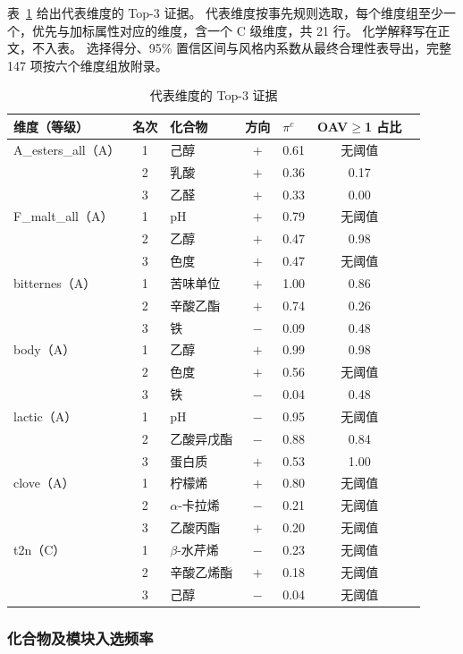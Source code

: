 表~\ref{tab:q2-rep} 给出代表维度的 Top-3 证据。
代表维度按事先规则选取，每个维度组至少一个，优先与加标属性对应的维度，含一个 C 级维度，共 21 行。
化学解释写在正文，不入表。
选择得分、95\% 置信区间与风格内系数从最终合理性表导出，完整 147 项按六个维度组放附录。

\begin{table}[htbp]
\centering\small
\caption{代表维度的 Top-3 证据}
\label{tab:q2-rep}
\begin{tabular}{lclclcl}
\toprule
维度（等级） & 名次 & 化合物 & 方向 & $\pi^c$ & OAV$\ge$1 占比 \\
\midrule
A\_esters\_all（A） & 1 & 己醇 & $+$ & 0.61 & 无阈值 \\
 & 2 & 乳酸 & $+$ & 0.36 & 0.17 \\
 & 3 & 乙醛 & $+$ & 0.33 & 0.00 \\
\addlinespace
F\_malt\_all（A） & 1 & pH & $+$ & 0.79 & 无阈值 \\
 & 2 & 乙醇 & $+$ & 0.47 & 0.98 \\
 & 3 & 色度 & $+$ & 0.47 & 无阈值 \\
\addlinespace
bitternes（A） & 1 & 苦味单位 & $+$ & 1.00 & 0.86 \\
 & 2 & 辛酸乙酯 & $+$ & 0.74 & 0.26 \\
 & 3 & 铁 & $-$ & 0.09 & 0.48 \\
\addlinespace
body（A） & 1 & 乙醇 & $+$ & 0.99 & 0.98 \\
 & 2 & 色度 & $+$ & 0.56 & 无阈值 \\
 & 3 & 铁 & $-$ & 0.04 & 0.48 \\
\addlinespace
lactic（A） & 1 & pH & $-$ & 0.95 & 无阈值 \\
 & 2 & 乙酸异戊酯 & $-$ & 0.88 & 0.84 \\
 & 3 & 蛋白质 & $+$ & 0.53 & 1.00 \\
\addlinespace
clove（A） & 1 & 柠檬烯 & $+$ & 0.80 & 无阈值 \\
 & 2 & $\alpha$-卡拉烯 & $-$ & 0.21 & 无阈值 \\
 & 3 & 乙酸丙酯 & $+$ & 0.20 & 无阈值 \\
\addlinespace
t2n（C） & 1 & $\beta$-水芹烯 & $-$ & 0.23 & 无阈值 \\
 & 2 & 辛酸乙烯酯 & $+$ & 0.18 & 无阈值 \\
 & 3 & 己醇 & $-$ & 0.04 & 无阈值 \\
\bottomrule
\end{tabular}
\end{table}

\subsubsection{化合物及模块入选频率}

